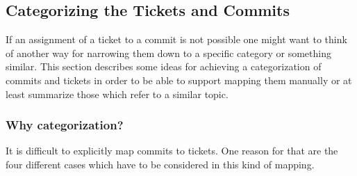 \subsection{Categorizing the Tickets and Commits}

If an assignment of a ticket to a commit is not possible one might want to think of another way for narrowing them down to a specific category or something similar.
This section describes some ideas for achieving a categorization of commits and tickets in order to be able to support mapping them manually or at least summarize those which refer to a similar topic.

\subsubsection{Why categorization?}

It is difficult to explicitly map commits to tickets.
One reason for that are the four different cases which have to be considered in this kind of mapping.\\


